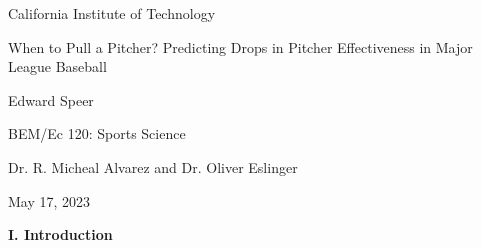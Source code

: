 \documentclass[12 pt]{article}
\begin{document}
\begin{center} \normalsize California Institute of Technology \\ \end{center}
\vspace*{\fill}
\begin{center}
    \Large When to Pull a Pitcher? Predicting Drops in Pitcher Effectiveness in 
    Major League Baseball \color{black}
\end{center}
\vspace*{\fill}
\begin{center} \normalsize Edward Speer\\ \end{center}
\begin{center} \normalsize BEM/Ec 120: Sports Science\\ \end{center}
\begin{center} \normalsize Dr. R. Micheal Alvarez and Dr. Oliver Eslinger\\ \end{center}
\begin{center} \normalsize May 17, 2023\\ \end{center}


\pagebreak

\textbf{I. Introduction} \\
\end{document}
